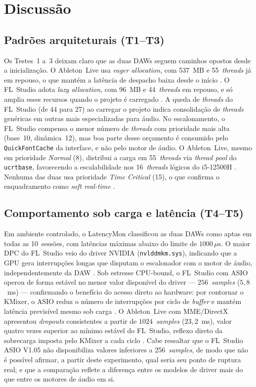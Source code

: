 \documentclass[tcc1]{classe_uftex/uftex}
\begin{document}
\chapter{Discussão}

\section{Padrões arquiteturais (T1--T3)}

Os Testes~1 a~3 deixam claro que as duas DAWs seguem caminhos opostos
desde a inicialização. O Ableton~Live usa \textit{eager allocation}, com
537~MB e 55~\textit{threads} já em repouso, o que mantém a latência de
despacho baixa desde o início \cite{silberschatz2018}. O FL~Studio adota
\textit{lazy allocation}, com 96~MB e 44~\textit{threads} em repouso, e
só amplia esses recursos quando o projeto é carregado \cite{tanenbaum2016}.
A queda de \textit{threads} do FL~Studio (de 44 para 27) ao carregar o
projeto indica consolidação de \textit{threads} genéricas em outras mais
especializadas para áudio. No escalonamento, o FL~Studio compensa o
menor número de \textit{threads} com prioridade mais alta (base~10,
dinâmica~12), mas boa parte desse orçamento é consumido pelo
\texttt{QuickFontCache} da interface, e não pelo motor de áudio. O
Ableton~Live, mesmo em prioridade \textit{Normal} (8), distribui a
carga em 55~\textit{threads} via \textit{thread pool} do
\texttt{ucrtbase}, favorecendo a escalabilidade nos 16~\textit{threads}
lógicos do i5-12500H \cite{jain1991}. Nenhuma das duas usa prioridade
\textit{Time Critical} (15), o que confirma o enquadramento como
\textit{soft real-time} \cite{stallings2017os}.

\section{Comportamento sob carga e latência (T4--T5)}

Em ambiente controlado, o LatencyMon classificou as duas DAWs como
aptas em todas as 10~sessões, com latências máximas abaixo do limite
de $1000\,\mu$s. O maior DPC do FL~Studio veio do driver NVIDIA
(\texttt{nvlddmkm.sys}), indicando que a GPU gera interrupções longas
que disputam o escalonador com o motor de áudio, independentemente da
DAW \cite{silberschatz2018}. Sob estresse CPU-bound, o FL~Studio com ASIO operou
de forma estável no menor valor disponível do driver ---
$256$~\textit{samples} ($5{,}8$~ms) ---
confirmando o benefício do acesso direto ao hardware: por contornar
o KMixer, o ASIO reduz o número de interrupções por ciclo de
\textit{buffer} e mantém latência previsível mesmo sob carga
\cite{microsoft2023asio}. O Ableton~Live com MME/DirectX apresentou
\textit{dropouts} consistentes a partir de $1024$~\textit{samples}
($23{,}2$~ms), valor quatro vezes superior ao mínimo estável do
FL~Studio, reflexo direto da sobrecarga imposta pelo KMixer a cada
ciclo \cite{microsoft2023asio,kim2003}. Cabe ressaltar que o
FL~Studio ASIO V1.05 não disponibiliza valores inferiores a
256~\textit{samples}, de modo que não é possível afirmar, a partir
deste experimento, qual seria seu ponto de ruptura real; e que a
comparação reflete a diferença entre os modelos de driver mais do
que entre os motores de áudio em si.
\end{document}
